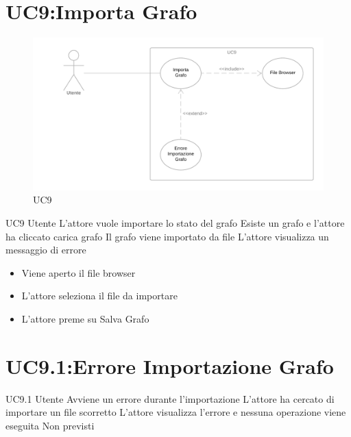 \documentclass[../AnalisideiRequisiti.tex]{subfiles}
\begin{document}
\section{UC9:Importa Grafo}
\begin{figure}[H]
	\caption{UC9}
	\centering
	\includegraphics[width=\textwidth]{../img/UC09.png}
\end{figure}
\UserCase
{UC9}
{Utente}
{}
{L'attore vuole importare lo stato del grafo}
{Esiste un grafo e l'attore ha cliccato carica grafo}
{Il grafo viene importato da file}
{L'attore visualizza un messaggio di errore }
{
	{\begin{itemize}
			\item{} Viene aperto il file browser
			\item{} L'attore seleziona il file da importare
			\item{} L'attore preme su Salva Grafo
\end{itemize}}}
\section{UC9.1:Errore Importazione Grafo}
\UserCase
{UC9.1}
{Utente}
{}
{Avviene un errore durante l'importazione}
{L'attore ha cercato di importare un file scorretto}
{L'attore visualizza l'errore e nessuna operazione viene eseguita}
{Non previsti}
{}
\end{document}

